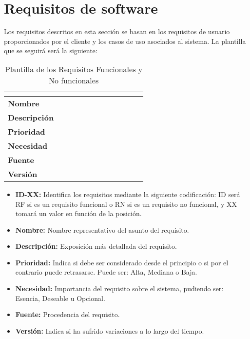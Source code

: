 \section{Requisitos de software}
Los requisitos descritos en esta sección se basan en los requisitos de usuario proporcionados por el cliente y los casos de uso asociados al sistema. La plantilla que se seguirá será la siguiente:
\begin{table}[H]
	\caption{Plantilla de los Requisitos Funcionales y No funcionales}
	\begin{tabular}{|l|l|}
		\hline
		\multicolumn{2}{|c|}{\cellcolor[HTML]{BFBFBF}{\color[HTML]{000000} \textbf{ID-XX}}} \\ \hline
		\textbf{Nombre}      &                                                      \\ \hline
		\textbf{Descripción} & $\quad\quad\quad\quad\quad\quad\quad\quad\quad\quad$ \\ \hline
		\textbf{Prioridad}   &                                                      \\ \hline
		\textbf{Necesidad}   &                                                      \\ \hline
		\textbf{Fuente}      &                                                      \\ \hline
		\textbf{Versión}     &                                                      \\ \hline
	\end{tabular}
\end{table}
\begin{itemize}
	\item \textbf{ID-XX:} Identifica los requisitos mediante la siguiente codificación: ID será RF si es un requisito funcional o RN si es un requisito no funcional, y XX tomará un valor en función de la posición.
	\item \textbf{Nombre:} Nombre representativo del asunto del requisito.
	\item \textbf{Descripción:} Exposición más detallada del requisito.
	\item \textbf{Prioridad:} Indica si debe ser considerado desde el principio o si por el contrario puede retrasarse. Puede ser: Alta, Mediana o Baja.
	\item \textbf{Necesidad:} Importancia del requisito sobre el sistema, pudiendo ser: Esencia, Deseable u Opcional.
	\item \textbf{Fuente:} Procedencia del requisito.
	\item \textbf{Versión:} Indica si ha sufrido variaciones a lo largo del tiempo.
\end{itemize}

